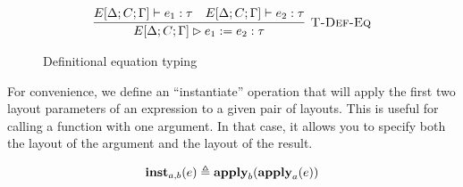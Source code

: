 \begin{figure}
  \[
    \begin{array}{c}
      \labinfer[T-Def-Eq]{E[\Delta;C;\Gamma] \rhd e_1 \defeq e_2 : \tau}
        {E[\Delta;C;\Gamma] \vdash e_1 : \tau
        &E[\Delta;C;\Gamma] \vdash e_2 : \tau}
    \end{array}
  \]
  \caption{Definitional equation typing}
  \label{fig:def-eq}
\end{figure}

For convenience, we define an ``instantiate'' operation \instExpr{} that will apply the first two
layout parameters of an expression to a given pair of layouts. This is useful for calling a function
with one argument. In that case, it allows you to specify both the layout of the argument and the
layout of the result.

\[
  \textbf{inst}_{a,b}(e) \triangleq \textbf{apply}_b(\textbf{apply}_a(e))
\]


